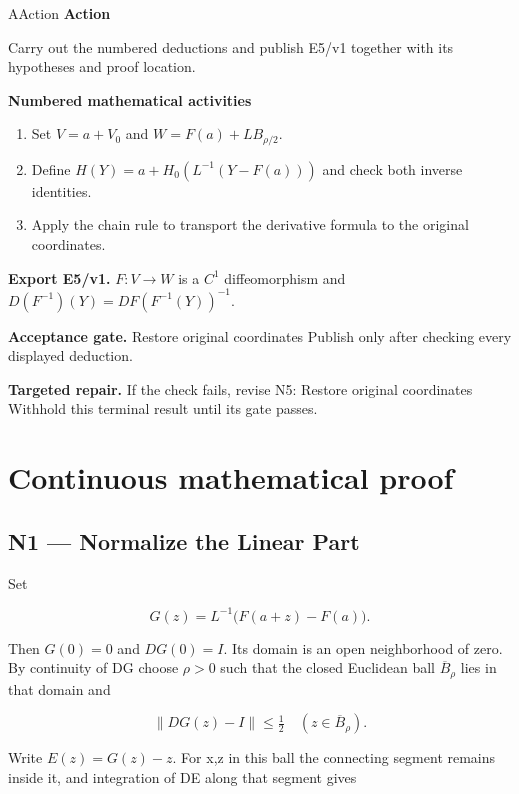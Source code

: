\documentclass[preprint,12pt,aps,pra,showkeys,amsmath,amssymb,superscriptaddress,floatfix]{revtex4-2}
\theoremstyle{definition}
\theoremstyle{remark}
\newcommand{\mmfaculty}[3]{%
 \begin{mmfacultybox}{#1}{#2}
 {\sffamily\bfseries\color{MMBlue}#2}\par\smallskip #3
 \end{mmfacultybox}}
\newcommand{\field}[2]{\par\smallskip\noindent\textbf{#1.} #2\par}
\begin{document}
\mmfaculty{A}{Action}{Carry out the numbered deductions and publish E5/v1 together with its
hypotheses and proof location.}

\smallskip\noindent\textbf{Numbered mathematical activities}

\begin{enumerate}[label=N5.\arabic*,leftmargin=3.4em]

\item Set \(V=a+V_0\) and \(W=F(a)+L B_{\rho/2}\).

\item Define \(H(Y)=a+H_0(L^{-1}(Y-F(a)))\) and check both inverse identities.

\item Apply the chain rule to transport the derivative formula to the original
coordinates.

\end{enumerate}

\field{Export E5/v1}{\(F:V\to W\) is a \(C^1\) diffeomorphism and
\(D(F^{-1})(Y)=DF(F^{-1}(Y))^{-1}\).}

\field{Acceptance gate}{Restore original coordinates Publish only after checking every displayed
deduction.}

\field{Targeted repair}{If the check fails, revise N5: Restore original coordinates Withhold
this terminal result until its gate passes.}

\endgroup\clearpage\section{Continuous mathematical proof}\label{sec:proof}

\subsection{N1 --- Normalize the Linear
Part}\label{n1-normalize-the-linear-part}

Set

\[G(z)=L^{-1}\big(F(a+z)-F(a)\big).\]

Then \(G(0)=0\) and \(DG(0)=I\). Its domain is an open neighborhood of
zero. By continuity of DG choose \(\rho >0\) such that the closed
Euclidean ball \(\overline B_\rho\) lies in that domain and

\[\|DG(z)-I\|\le\tfrac12\quad(z\in\overline B_\rho).\]

Write \(E(z)=G(z)-z\). For x,z in this ball the connecting segment
remains inside it, and integration of DE along that segment gives
\end{document}
